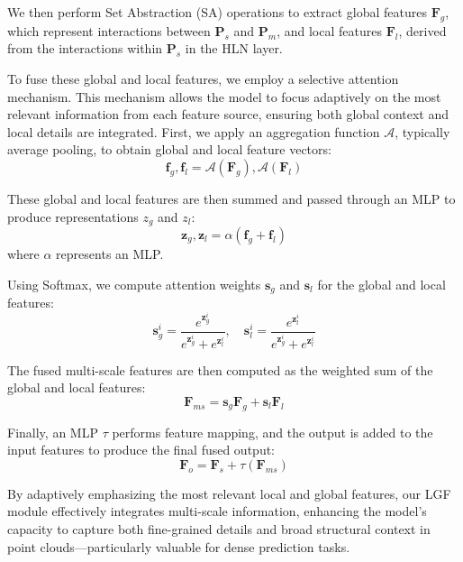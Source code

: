We then perform Set Abstraction (SA) operations to extract global features $\boldsymbol{F}_g$, which represent interactions between $\boldsymbol{P}_s$ and $\boldsymbol{P}_m$, and local features $\boldsymbol{F}_l$, derived from the interactions within $\boldsymbol{P}_s$ in the HLN layer.

To fuse these global and local features, we employ a selective attention mechanism. This mechanism allows the model to focus adaptively on the most relevant information from each feature source, ensuring both global context and local details are integrated. First, we apply an aggregation function $\mathcal{A}$, typically average pooling, to obtain global and local feature vectors:
\begin{equation}
	\boldsymbol{f}_g, \boldsymbol{f}_l = \mathcal{A}(\boldsymbol{F}_g),  \mathcal{A}(\boldsymbol{F}_l)
\end{equation}

These global and local features are then summed and passed through an MLP to produce representations $z_g$ and $z_l$:
\begin{equation}
	\boldsymbol{z}_g, \boldsymbol{z}_l = \alpha \left( \boldsymbol{f}_g + \boldsymbol{f}_l \right)
\end{equation}
where $\alpha$ represents an MLP.

Using Softmax, we compute attention weights $\boldsymbol{s}_g$ and $\boldsymbol{s}_l$ for the global and local features:
\begin{equation}
	\boldsymbol{s}_g^i = \frac{e^{\boldsymbol{z}_g^i}}{e^{\boldsymbol{z}_g^i} + e^{\boldsymbol{z}_l^i}}, \quad \boldsymbol{s}_l^i = \frac{e^{\boldsymbol{z}_l^i}}{e^{\boldsymbol{z}_g^i} + e^{\boldsymbol{z}_l^i}}
\end{equation}

The fused multi-scale features are then computed as the weighted sum of the global and local features:
\begin{equation}
	\boldsymbol{F}_{ms} = \boldsymbol{s}_g \boldsymbol{F}_g + \boldsymbol{s}_l \boldsymbol{F}_l
\end{equation}

Finally, an MLP $\tau$ performs feature mapping, and the output is added to the input features to produce the final fused output:
\begin{equation}
	\boldsymbol{F}_{o} = \boldsymbol{F}_s + \tau \left( \boldsymbol{F}_{ms} \right)
\end{equation}

By adaptively emphasizing the most relevant local and global features, our LGF module effectively integrates multi-scale information, enhancing the model's capacity to capture both fine-grained details and broad structural context in point clouds—particularly valuable for dense prediction tasks.

